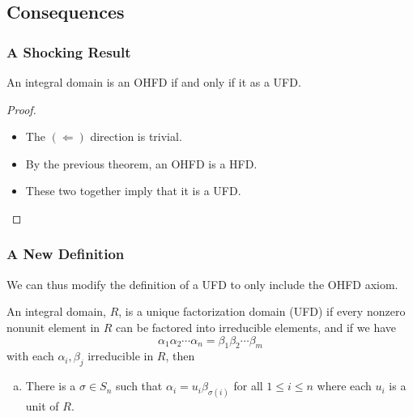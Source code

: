 \subsection{Consequences}

\begin{frame}
  \frametitle{A Shocking Result}
  \begin{theorem}
    An integral domain is an OHFD if and only if it as a UFD.
  \end{theorem}
  \pause{}
  \begin{proof}
    \begin{itemize}
      \item<1-> The $(\Leftarrow)$ direction is trivial.
      \item<2-> By the previous theorem, an OHFD is a HFD. 
      \item<3-> These two together imply that it is a UFD.
    \end{itemize}
  \end{proof}
\end{frame}

\begin{frame}
  \frametitle{A New Definition}
  \begin{fact}
    We can thus modify the definition of a UFD to only include the OHFD axiom.
  \end{fact}
  \pause{}
  \begin{definition}
    An integral domain, $R$, is a \alert{unique factorization domain (UFD)} if every nonzero nonunit element in $R$ can be factored into irreducible elements, and if we have
    $$ \alpha_1 \alpha_2 \cdots \alpha_n = \beta_1 \beta_2 \cdots \beta_m $$
    with each $\alpha_i, \beta_j$ irreducible in $R$, then
    \begin{enumerate}[(a)]
      \item There is a $\sigma \in S_n$ such that $\alpha_i = u_i \beta_{\sigma(i)}$ for all $1 \leq i \leq n$ where each $u_i$ is a unit of $R$.
    \end{enumerate}
  \end{definition}
\end{frame}
